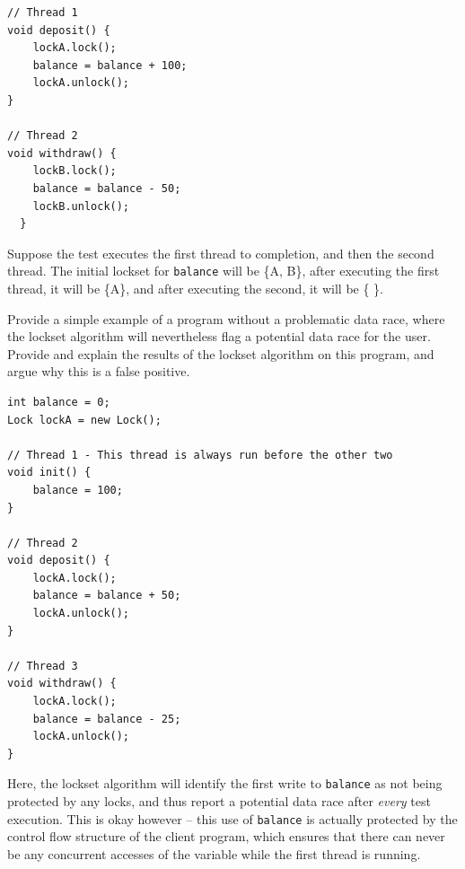 \documentclass[addpoints, answers]{exam}
\begin{document}
\begin{questions}
\begin{solution}
\begin{verbatim}
// Thread 1
void deposit() {
    lockA.lock();
    balance = balance + 100;
    lockA.unlock();
}

// Thread 2
void withdraw() {
    lockB.lock();
    balance = balance - 50;
    lockB.unlock();
  }
\end{verbatim}
    Suppose the test executes the first thread to completion, and then
    the second thread. The initial lockset for \texttt{balance} will be \{A, B\},
    after executing the first thread, it will be \{A\}, and after
    executing the second, it will be \{ \}.


\end{solution}

\question Provide a simple example of a program without a
  problematic data race, where the lockset algorithm will nevertheless
  flag a potential data race for the user. Provide and explain the
  results of the lockset algorithm on this program, and argue why this
  is a false positive.

  \begin{solution}
    \begin{verbatim}
int balance = 0;
Lock lockA = new Lock();

// Thread 1 - This thread is always run before the other two
void init() {
    balance = 100;
}

// Thread 2
void deposit() {
    lockA.lock();
    balance = balance + 50;
    lockA.unlock();
}

// Thread 3
void withdraw() {
    lockA.lock();
    balance = balance - 25;
    lockA.unlock();
}
\end{verbatim}

    Here, the lockset algorithm will identify the first write to
    \texttt{balance} as not being protected by any locks,
    and thus report a potential data race after \emph{every} test
    execution. This is okay however -- this use of
    \texttt{balance} is actually protected by the control
    flow structure of the client program, which ensures that there can
    never be any concurrent accesses of  the variable while the first
    thread is running.
  \end{solution}







\end{questions}
\end{document}
